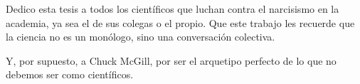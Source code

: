 Dedico esta tesis a todos los científicos que luchan contra el narcisismo en la academia, ya sea el de sus colegas o el propio. Que este trabajo les recuerde que la ciencia no es un monólogo, sino una conversación colectiva.

Y, por supuesto, a Chuck McGill, por ser el arquetipo perfecto de lo que no debemos ser como científicos.